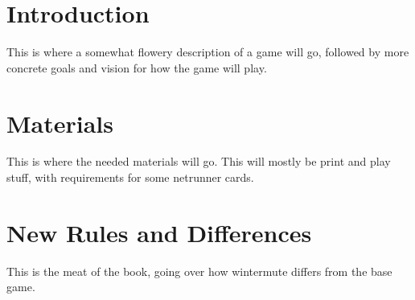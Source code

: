 \documentclass[titlepage]{article}
\begin{document}
\section{Introduction}
This is where a somewhat flowery description of a game will go, followed by more concrete goals and vision for how the game will play.
\section{Materials}
This is where the needed materials will go. This will mostly be print and play stuff, with requirements for some netrunner cards.
\section{New Rules and Differences}
This is the meat of the book, going over how wintermute differs from the base game.
\end{document}
